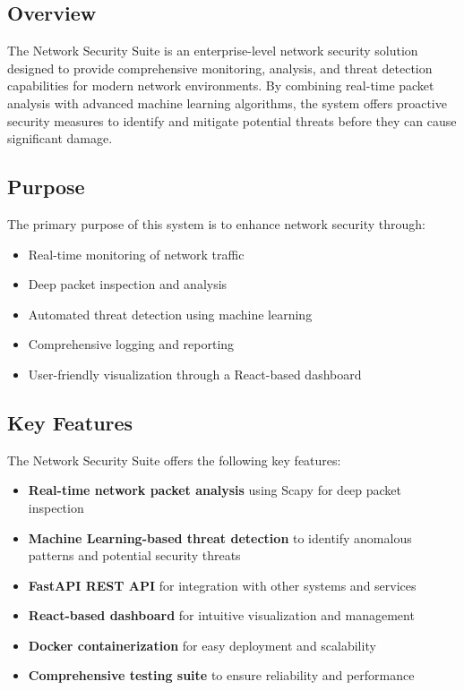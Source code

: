 \subsection{Overview}
The Network Security Suite is an enterprise-level network security solution designed to provide comprehensive monitoring, analysis, and threat detection capabilities for modern network environments. By combining real-time packet analysis with advanced machine learning algorithms, the system offers proactive security measures to identify and mitigate potential threats before they can cause significant damage.

\subsection{Purpose}
The primary purpose of this system is to enhance network security through:
\begin{itemize}
    \item Real-time monitoring of network traffic
    \item Deep packet inspection and analysis
    \item Automated threat detection using machine learning
    \item Comprehensive logging and reporting
    \item User-friendly visualization through a React-based dashboard
\end{itemize}

\subsection{Key Features}
The Network Security Suite offers the following key features:
\begin{itemize}
    \item \textbf{Real-time network packet analysis} using Scapy for deep packet inspection
    \item \textbf{Machine Learning-based threat detection} to identify anomalous patterns and potential security threats
    \item \textbf{FastAPI REST API} for integration with other systems and services
    \item \textbf{React-based dashboard} for intuitive visualization and management
    \item \textbf{Docker containerization} for easy deployment and scalability
    \item \textbf{Comprehensive testing suite} to ensure reliability and performance
\end{itemize}

